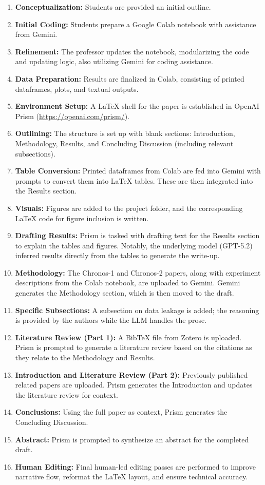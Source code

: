 \documentclass[twocolumn]{article}
\begin{document}
\begin{enumerate}[label=\arabic*.]
    \item \textbf{Conceptualization:} Students are provided an initial outline.
    \item \textbf{Initial Coding:} Students prepare a Google Colab notebook with assistance from Gemini.
    \item \textbf{Refinement:} The professor updates the notebook, modularizing the code and updating logic, also utilizing Gemini for coding assistance.
    \item \textbf{Data Preparation:} Results are finalized in Colab, consisting of printed dataframes, plots, and textual outputs.
    \item \textbf{Environment Setup:} A \LaTeX{} shell for the paper is established in OpenAI Prism (\url{https://openai.com/prism/}).
    \item \textbf{Outlining:} The structure is set up with blank sections: Introduction, Methodology, Results, and Concluding Discussion (including relevant subsections).
    \item \textbf{Table Conversion:} Printed dataframes from Colab are fed into Gemini with prompts to convert them into \LaTeX{} tables. These are then integrated into the Results section.
    \item \textbf{Visuals:} Figures are added to the project folder, and the corresponding \LaTeX{} code for figure inclusion is written.
    \item \textbf{Drafting Results:} Prism is tasked with drafting text for the Results section to explain the tables and figures. Notably, the underlying model (GPT-5.2) inferred results directly from the tables to generate the write-up.
    \item \textbf{Methodology:} The Chronos-1 and Chronos-2 papers, along with experiment descriptions from the Colab notebook, are uploaded to Gemini. Gemini generates the Methodology section, which is then moved to the draft.
    \item \textbf{Specific Subsections:} A subsection on data leakage is added; the reasoning is provided by the authors while the LLM handles the prose.
    \item \textbf{Literature Review (Part 1):} A Bib\TeX{} file from Zotero is uploaded. Prism is prompted to generate a literature review based on the citations as they relate to the Methodology and Results.
    \item \textbf{Introduction and Literature Review (Part 2):} Previously published related papers are uploaded. Prism generates the Introduction and updates the literature review for context.
    \item \textbf{Conclusions:} Using the full paper as context, Prism generates the Concluding Discussion.
    \item \textbf{Abstract:} Prism is prompted to synthesize an abstract for the completed draft.
    \item \textbf{Human Editing:} Final human-led editing passes are performed to improve narrative flow, reformat the \LaTeX{} layout, and ensure technical accuracy.
\end{enumerate}
\end{document}
